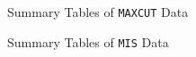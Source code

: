 \documentclass[10pt]{article}
\begin{document}
{\huge \centering Summary Tables of \texttt{MAXCUT} Data}

{\huge \centering Summary Tables of \texttt{MIS} Data}
\end{document}
